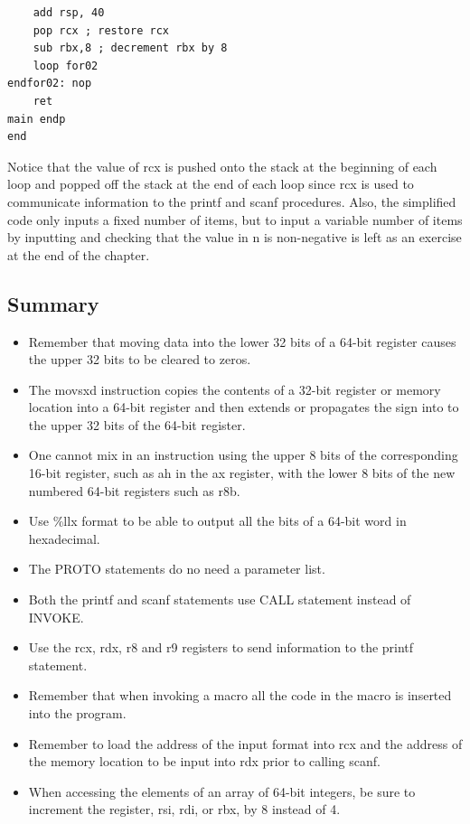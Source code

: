 \documentclass[10pt]{book}
\begin{document}
\begin{verbatim}
    add rsp, 40
    pop rcx ; restore rcx
    sub rbx,8 ; decrement rbx by 8
    loop for02
endfor02: nop
    ret
main endp
end
\end{verbatim}

Notice that the value of rcx is pushed onto the stack at the beginning of each loop and popped off the stack at the end of each loop since rcx is used to communicate information to the printf and scanf procedures. Also, the simplified code only inputs a fixed number of items, but to input a variable number of items by inputting and checking that the value in n is non-negative is left as an exercise at the end of the chapter.
\subsection{Summary}
\begin{itemize}
  \item Remember that moving data into the lower 32 bits of a 64-bit register causes the upper 32 bits to be cleared to zeros.
  \item The movsxd instruction copies the contents of a 32-bit register or memory location into a 64-bit register and then extends or propagates the sign into to the upper 32 bits of the 64-bit register.
  \item One cannot mix in an instruction using the upper 8 bits of the corresponding 16-bit register, such as ah in the ax register, with the lower 8 bits of the new numbered 64-bit registers such as r8b.
  \item Use \%llx format to be able to output all the bits of a 64-bit word in hexadecimal.
  \item The PROTO statements do no need a parameter list.
  \item Both the printf and scanf statements use CALL statement instead of INVOKE.
  \item Use the rcx, rdx, r8 and r9 registers to send information to the printf statement.
  \item Remember that when invoking a macro all the code in the macro is inserted into the program.
  \item Remember to load the address of the input format into rcx and the address of the memory location to be input into rdx prior to calling scanf.
  \item When accessing the elements of an array of 64-bit integers, be sure to increment the register, rsi, rdi, or rbx, by 8 instead of 4.
\end{itemize}
\end{document}
